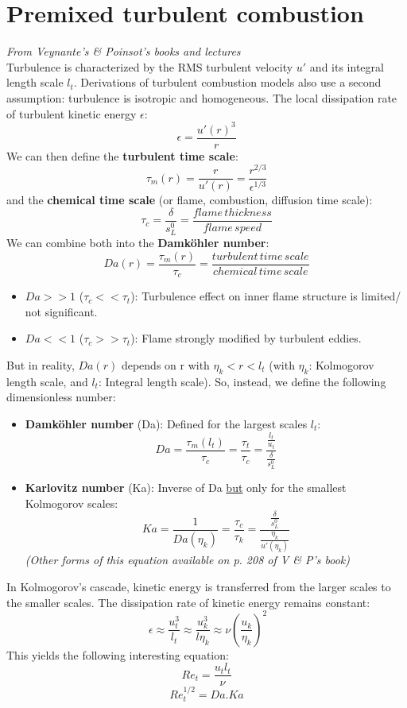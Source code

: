 \documentclass[a4paper,11pt]{article}
\begin{document}
\section{Premixed turbulent combustion}
\textit{From Veynante's \& Poinsot's books and lectures}\vspace{5pt}\\
	Turbulence is characterized by the RMS turbulent velocity $u'$ and its integral length scale $l_t$. Derivations of turbulent combustion models also use a second assumption: turbulence is isotropic and homogeneous. The local dissipation rate of turbulent kinetic energy $\epsilon$:
	\[\epsilon = \frac{u'(r)^3}{r}\]
	We can then define the \textbf{turbulent time scale}: 
	\[\tau_m(r) = \frac{r}{u'(r)} = \frac{r^{2/3}}{\epsilon^{1/3}}\] 
	and the \textbf{chemical time scale} (or flame, combustion, diffusion time scale):
	\[\tau_c = \frac{\delta}{s^0_L} = \frac{flame\,thickness}{flame\,speed} \]
	We can combine both into the \textbf{Damköhler number}:
	\[Da(r) = \frac{\tau_m(r)}{\tau_c}= \frac{turbulent\,time\,scale}{chemical\,time\,scale}\]
	\begin{itemize}
		\item $Da>>1$ ($\tau_c<<\tau_t$): Turbulence effect on inner flame structure is limited/ not significant.
		\item $Da<<1$ ($\tau_c>>\tau_t$): Flame strongly modified by turbulent eddies.
	\end{itemize}
But in reality, $Da(r)$ depends on r with $\eta_k < r < l_t$ (with $\eta_k$: Kolmogorov length scale, and $l_t$: Integral length scale). So, instead, we define the following dimensionless number:
\begin{itemize}
	\item \textbf{Damköhler number} (Da): Defined for the largest scales $l_t$:
	\[Da = \frac{\tau_m(l_t)}{\tau_c}=\frac{\tau_t}{\tau_c} = \frac{\frac{l_t}{u_t}}{\frac{\delta}{s^0_L}}\]
	\item \textbf{Karlovitz number} (Ka): Inverse of Da \underline{but} only for the smallest Kolmogorov scales:
	\[Ka = \frac{1}{Da(\eta_k)} = \frac{\tau_c}{\tau_k} = \frac{\frac{\delta}{s^0_L}}{\frac{\eta_k}{u'(\eta_k)}}  \]
	\textit{(Other forms of this equation available on p. 208 of V \& P's book)}
\end{itemize}
In Kolmogorov's cascade, kinetic energy is transferred from the larger scales to the smaller scales. The dissipation rate of kinetic energy remains constant:
\[\ \epsilon \approx \frac{u_t^3}{l_t} \approx \frac{u_k^3}{l\eta_k} \approx \nu(\frac{u_k}{\eta_k})^2\]
This yields the following interesting equation:
\[ Re_t = \frac{u_t l_t}{\nu} \]
\[ Re_t^{1/2} = Da.Ka \]
\end{document}
